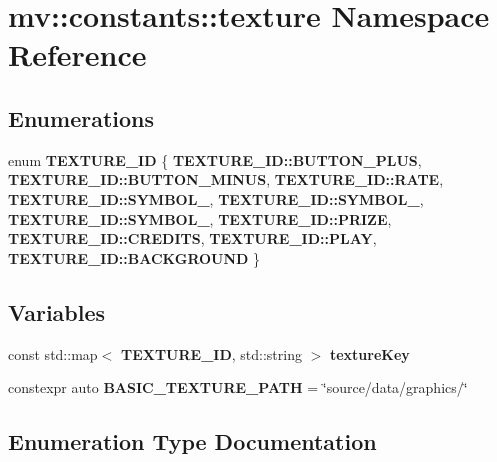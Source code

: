 \section{mv\+:\+:constants\+:\+:texture Namespace Reference}
\label{namespacemv_1_1constants_1_1texture}
\subsection*{Enumerations}
\begin{DoxyCompactItemize}
\item 
enum \textbf{ T\+E\+X\+T\+U\+R\+E\+\_\+\+ID} \{ \newline
\textbf{ T\+E\+X\+T\+U\+R\+E\+\_\+\+I\+D\+::\+B\+U\+T\+T\+O\+N\+\_\+\+P\+L\+US}, 
\textbf{ T\+E\+X\+T\+U\+R\+E\+\_\+\+I\+D\+::\+B\+U\+T\+T\+O\+N\+\_\+\+M\+I\+N\+US}, 
\textbf{ T\+E\+X\+T\+U\+R\+E\+\_\+\+I\+D\+::\+R\+A\+TE}, 
\textbf{ T\+E\+X\+T\+U\+R\+E\+\_\+\+I\+D\+::\+S\+Y\+M\+B\+O\+L\+\_}, 
\newline
\textbf{ T\+E\+X\+T\+U\+R\+E\+\_\+\+I\+D\+::\+S\+Y\+M\+B\+O\+L\+\_}, 
\textbf{ T\+E\+X\+T\+U\+R\+E\+\_\+\+I\+D\+::\+S\+Y\+M\+B\+O\+L\+\_}, 
\textbf{ T\+E\+X\+T\+U\+R\+E\+\_\+\+I\+D\+::\+P\+R\+I\+ZE}, 
\textbf{ T\+E\+X\+T\+U\+R\+E\+\_\+\+I\+D\+::\+C\+R\+E\+D\+I\+TS}, 
\newline
\textbf{ T\+E\+X\+T\+U\+R\+E\+\_\+\+I\+D\+::\+P\+L\+AY}, 
\textbf{ T\+E\+X\+T\+U\+R\+E\+\_\+\+I\+D\+::\+B\+A\+C\+K\+G\+R\+O\+U\+ND}
 \}
\end{DoxyCompactItemize}
\subsection*{Variables}
\begin{DoxyCompactItemize}
\item 
const std\+::map$<$ \textbf{ T\+E\+X\+T\+U\+R\+E\+\_\+\+ID}, std\+::string $>$ \textbf{ texture\+Key}
\item 
constexpr auto \textbf{ B\+A\+S\+I\+C\+\_\+\+T\+E\+X\+T\+U\+R\+E\+\_\+\+P\+A\+TH} = \char`\"{}source/data/graphics/\char`\"{}
\end{DoxyCompactItemize}


\subsection{Enumeration Type Documentation}
\mbox{\label{namespacemv_1_1constants_1_1texture_a31854dc8c0c36ef4deba53aa1fc80bce}} 
